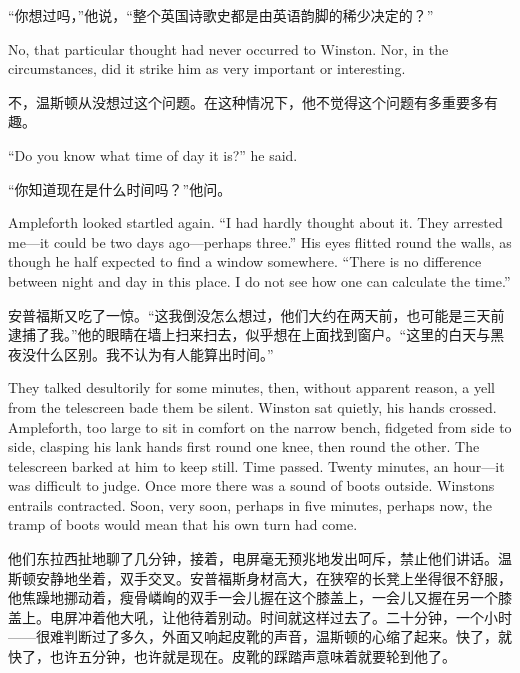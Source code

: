 \begin{paracol}{2}
\switchcolumn

``你想过吗，''他说，``整个英国诗歌史都是由英语韵脚的稀少决定的？''

\switchcolumn*

No, that particular thought had never occurred to Winston. Nor, in the
circumstances, did it strike him as very important or interesting.

\switchcolumn

不，温斯顿从没想过这个问题。在这种情况下，他不觉得这个问题有多重要多有趣。

\switchcolumn*

``Do you know what time of day it is?'' he said.

\switchcolumn

``你知道现在是什么时间吗？''他问。

\switchcolumn*

Ampleforth looked startled again. ``I had hardly thought about it. They
arrested me---it could be two days ago---perhaps three.'' His eyes
flitted round the walls, as though he half expected to find a window
somewhere. ``There is no difference between night and day in this place.
I do not see how one can calculate the time.''

\switchcolumn

安普福斯又吃了一惊。``这我倒没怎么想过，他们大约在两天前，也可能是三天前逮捕了我。''他的眼睛在墙上扫来扫去，似乎想在上面找到窗户。``这里的白天与黑夜没什么区别。我不认为有人能算出时间。''

\switchcolumn*

They talked desultorily for some minutes, then, without apparent reason,
a yell from the telescreen bade them be silent. Winston sat quietly, his
hands crossed. Ampleforth, too large to sit in comfort on the narrow
bench, fidgeted from side to side, clasping his lank hands first round
one knee, then round the other. The telescreen barked at him to keep
still. Time passed. Twenty minutes, an hour---it was difficult to judge.
Once more there was a sound of boots outside. Winston\textquotesingle s
entrails contracted. Soon, very soon, perhaps in five minutes, perhaps
now, the tramp of boots would mean that his own turn had come.

\switchcolumn

他们东拉西扯地聊了几分钟，接着，电屏毫无预兆地发出呵斥，禁止他们讲话。温斯顿安静地坐着，双手交叉。安普福斯身材高大，在狭窄的长凳上坐得很不舒服，他焦躁地挪动着，瘦骨嶙峋的双手一会儿握在这个膝盖上，一会儿又握在另一个膝盖上。电屏冲着他大吼，让他待着别动。时间就这样过去了。二十分钟，一个小时——很难判断过了多久，外面又响起皮靴的声音，温斯顿的心缩了起来。快了，就快了，也许五分钟，也许就是现在。皮靴的踩踏声意味着就要轮到他了。


\end{paracol}

